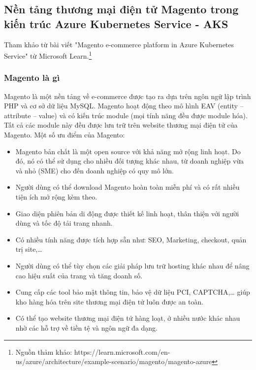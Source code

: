\newpage
\subsection{Nền tảng thương mại điện tử Magento trong kiến trúc Azure Kubernetes Service - AKS}
\noindent Tham khảo từ bài viết "Magento e-commerce platform in Azure Kubernetes Service" từ Microsoft Learn.\footnote{Nguồn thảm khảo: https://learn.microsoft.com/en-us/azure/architecture/example-scenario/magento/magento-azure}
\subsubsection{Magento là gì}
\noindent Magento là một nền tảng về e-commerce được tạo ra dựa trên ngôn ngữ lập trình PHP và cơ sở dữ liệu MySQL. Magento hoạt động theo mô hình EAV (entity – attribute – value) và có kiến trúc module (mọi tính năng đều được module hóa). Tất cả các module này đều được lưu trữ trên website thương mại điện tử của Magento.
\newline
Một số ưu điểm của Magento:
    \begin{itemize}
        \item Magento bản chất là một open source với khả năng mở rộng linh hoạt. Do đó, nó có thể sử dụng cho nhiều đối tượng khác nhau, từ doanh nghiệp vừa và nhỏ (SME) cho đến doanh nghiệp có quy mô lớn.
        \item Người dùng có thể download Magento hoàn toàn miễn phí và có rất nhiều tiện ích mở rộng kèm theo.
        \item Giao diện phiên bản di động được thiết kế linh hoạt, thân thiện với người dùng và tốc độ tải trang nhanh.
        \item Có nhiều tính năng được tích hợp sẵn như: SEO, Marketing, checkout, quản trị site,…
        \item Người dùng có thể tùy chọn các giải pháp lưu trữ hosting khác nhau để nâng cao hiệu suất của trang và tăng doanh số.
        \item Cung cấp các tool bảo mật thông tin, bảo vệ dữ liệu PCI, CAPTCHA,… giúp kho hàng hóa trên site thương mại điện tử luôn được an toàn.
        \item Có thể tạo website thương mại điện tử hàng loạt, ở nhiều nước khác nhau nhờ các hỗ trợ về tiền tệ và ngôn ngữ đa dạng.    
    \end{itemize}
